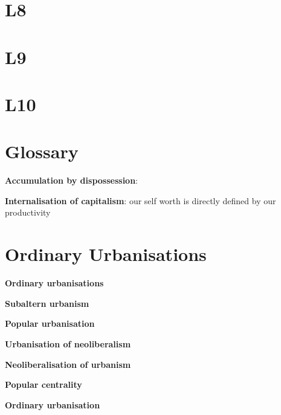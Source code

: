 \documentclass{article}
\begin{document}
\pagebreak
\section{L8}


\pagebreak
\section{L9}


\pagebreak
\section{L10}

\section{Glossary}

\textbf{Accumulation by dispossession}:

\textbf{Internalisation of capitalism}: our self worth is directly defined by our productivity

\section{Ordinary Urbanisations}

\textbf{Ordinary urbanisations}

\textbf{Subaltern urbanism}

\textbf{Popular urbanisation}

\textbf{Urbanisation of neoliberalism}

\textbf{Neoliberalisation of urbanism}

\textbf{Popular centrality}

\textbf{Ordinary urbanisation}


\textbf{}


\textbf{}
\end{document}
